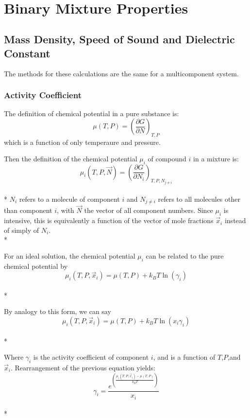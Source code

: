 \documentclass[aps,pre,twocolumn,nofootinbib,superscriptaddress,linenumbers,10pt, draft,tightenlines]{revtex4-1}
\begin{document}
\section{Binary Mixture Properties} 
\subsection{Mass Density, Speed of Sound and Dielectric Constant}
The methods for these calculations are the same for a multicomponent system.

\subsubsection{Activity Coefficient}
The definition of chemical potential in a pure substance is:
\begin{equation}\mu(T,P) = \left(\frac{\partial G}{\partial N}\right)_{T,P}\end{equation}
which is a function of only temperaure and pressure.

Then the definition of the chemical potential $\mu_i$ of compound $i$ in a mixture is:
\begin{equation}\mu_{i}(T,P,\vec{N}) = \left(\frac{\partial G}{\partial N_{i}}\right)_{T,P,N_{j \neq i}}\end{equation}\\*
$N_i$ refers to a molecule of component $i$ and $N_{j \neq i}$ refers
to all molecules other than component $i$, with $\vec{N}$ the vector
of all component numbers. Since $\mu_i$ is intensive, this is
equivalently a function of the vector of mole fractions $\vec{x}_i$ instead of simply of $N_i$.\\*

For an ideal solution, the chemical potential $\mu_i$ can be related to the pure chemical potential by 
\begin{equation}\mu_{i}(T,P,\vec{x}_i) = \mu(T,P) + k_B T \ln\left(\gamma_i\right)\end{equation}\\*

By analogy to this form, we can say 
\begin{equation}\mu_{i}(T,P,\vec{x}_i) = \mu(T,P) + k_B T \ln\left(x_i \gamma_i\right)\end{equation}\\*

Where $\gamma_i$ is the activity coefficient of component $i$, and is
a function of $T$,$P$,and $\vec{x}_i$.  Rearrangement of the previous
equation yields:
\begin{equation}\gamma_i = \frac{e^{\left(\frac{\mu_i(T,P,\vec{x}_i) - \mu(T,P)}{k_B T}\right)}}{x_i}\end{equation}\\*
\end{document}
